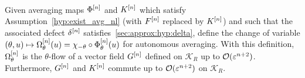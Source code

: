 \begin{theorem} \label{sec:approx:thm:commut} \hspace*{1em} 
\\
  Given averaging maps $\Phi^{[n]}$ and $K^{[n]}$ which satisfy
  Assumption~\ref{hyp:exist_avg_nl} (with $F^{[n]}$ replaced by $K^{[n]}$)
  and such that the associated defect $\delta^{[n]}$
  satisfies~\eqref{sec:approx:hyp:delta}, define the change of variable
  $(\theta, u) \mapsto \Omega^{[n]} _\theta(u) = \chi _{-\theta} \circ
  \Phi^{[n]} _\theta(u)$ for autonomous averaging. With this definition,
  $\Omega^{[n]} _\theta$ is the $\theta$-flow of a vector field $G^{[n]}$
  defined on $\mathcal{K}_R$ up to $\mathcal{O}(\varepsilon^{n+2})$. Furthermore, $G^{[n]}$ and $K^{[n]}$ commute up to $\mathcal{O}(\varepsilon^{n+2})$ on $\mathcal{K}_{R}$. 
\end{theorem}

